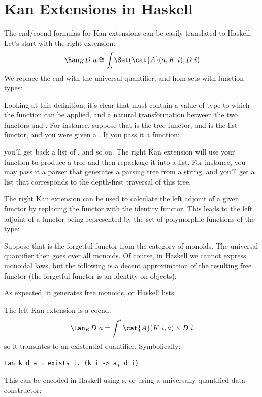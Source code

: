 \section{Kan Extensions in Haskell}

The end/coend formulas for Kan extensions can be easily translated to
Haskell. Let's start with the right extension:
\[\Ran_{K}D\ a \cong \int_i \Set(\cat{A}(a, K\ i), D\ i)\]
We replace the end with the universal quantifier, and hom-sets with
function types:

Looking at this definition, it's clear that  must contain a
value of type  to which the function can be applied, and a
natural transformation between the two functors  and
. For instance, suppose that  is the tree functor,
and  is the list functor, and you were given a
. If you pass it a function:

you'll get back a list of , and so on. The right Kan
extension will use your function to produce a tree and then repackage it
into a list. For instance, you may pass it a parser that generates a
parsing tree from a string, and you'll get a list that corresponds to
the depth-first traversal of this tree.

The right Kan extension can be used to calculate the left adjoint of a
given functor by replacing the functor  with the identity
functor. This leads to the left adjoint of a functor  being
represented by the set of polymorphic functions of the type:

Suppose that  is the forgetful functor from the category of
monoids. The universal quantifier then goes over all monoids. Of course,
in Haskell we cannot express monoidal laws, but the following is a
decent approximation of the resulting free functor (the forgetful
functor  is an identity on objects):

As expected, it generates free monoids, or Haskell lists:

The left Kan extension is a coend:
\[\Lan_{K}D\ a = \int^i \cat{A}(K\ i, a)\times{}D\ i\]
so it translates to an existential quantifier. Symbolically:

\begin{Verbatim}
Lan k d a = exists i. (k i -> a, d i)
\end{Verbatim}
This can be encoded in Haskell using s, or using a universally
quantified data constructor:

